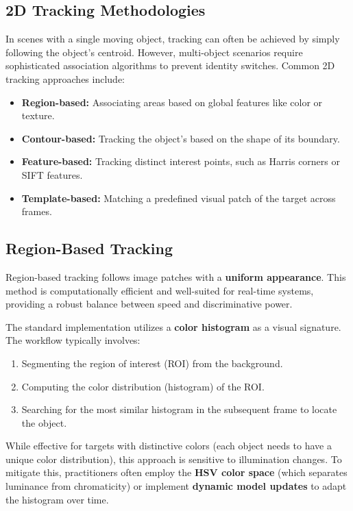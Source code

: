 \subsection{2D Tracking Methodologies}
In scenes with a single moving object, tracking can often be achieved by simply following the object's centroid. 
However, multi-object scenarios require sophisticated association algorithms to prevent identity switches. 
Common 2D tracking approaches include:
\begin{itemize}
    \item \textbf{Region-based:} Associating areas based on global features like color or texture.
    \item \textbf{Contour-based:} Tracking the object's based on the shape of its boundary.
    \item \textbf{Feature-based:} Tracking distinct interest points, such as Harris corners or SIFT features.
    \item \textbf{Template-based:} Matching a predefined visual patch of the target across frames.
\end{itemize}

\subsection{Region-Based Tracking}
Region-based tracking follows image patches with a \textbf{uniform appearance}. 
This method is computationally efficient and well-suited for real-time systems, providing a robust balance
between speed and discriminative power.

The standard implementation utilizes a \textbf{color histogram} as a visual signature. 
The workflow typically involves:
\begin{enumerate}
    \item Segmenting the region of interest (ROI) from the background.
    \item Computing the color distribution (histogram) of the ROI.
    \item Searching for the most similar histogram in the subsequent frame to locate the object.
\end{enumerate}

While effective for targets with distinctive colors (each object needs to have a unique color distribution), this approach is sensitive to illumination changes. 
To mitigate this, practitioners often employ the \textbf{HSV color space} (which separates luminance from chromaticity) 
or implement \textbf{dynamic model updates} to adapt the histogram over time.

